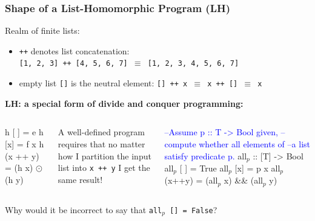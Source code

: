 \documentclass{beamer}
\newcommand{\blue}[1]{\textcolor{Blue}{{#1}}}
\newcommand{\emp}[1]{\textcolor{DikuRed}{ #1}}
\newcommand{\mymath}[1]{$ #1 $}
\newcommand{\myindx}[1]{_{#1}}
\begin{document}
\begin{frame}[fragile,t]
\frametitle{Shape of a List-Homomorphic Program (LH)}

Realm of finite lists:
\begin{itemize}
    \item {\tt ++} denotes list concatenation:\\
    {\tt [1, 2, 3] ++ [4, 5, 6, 7] $\equiv$ [1, 2, 3, 4, 5, 6, 7]}
    \item empty list {\tt []} is the neutral element:
        {\tt [] ++ x $\equiv$ x ++ [] $\equiv$ x}
\end{itemize}
\bigskip

\emp{\bf LH: a special form of divide and conquer programming:}
\begin{columns}
\begin{colorcode}[fontsize=\small]
h [ ]   = e
h [x]   = f x
h (x ++ y) = (h x) \mymath{\odot} (h y)
\end{colorcode}
\alert{A well-defined program requires that no matter how 
I partition the input list into {\tt x ++ y} I get the same result!}
\begin{colorcode}[fontsize=\small]
\blue{--Assume p :: T -> Bool given,}
\blue{--compute whether all elements of}
\blue{--a list satisfy predicate p.}
all\mymath{\myindx{p}} :: [T] -> Bool
all\mymath{\myindx{p}} [ ]  = True
all\mymath{\myindx{p}} [x]  = p x 
all\mymath{\myindx{p}} (x++y) = (all\mymath{\myindx{p}} x) && (all\mymath{\myindx{p}} y)
\end{colorcode}
\end{columns}\bigskip

\alert{Why would it be incorrect to say that {\tt all$_p$ [] = False}?}

\end{frame}
\end{document}
